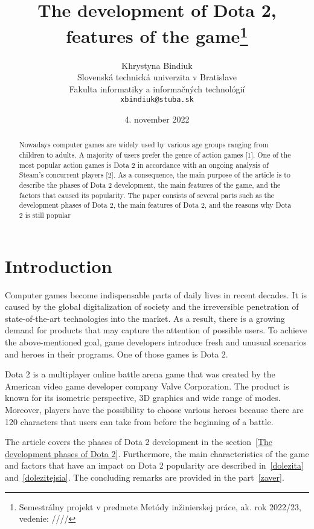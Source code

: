 \documentclass[10pt,twoside,slovak,a4paper]{article}
\title{The development of Dota 2, features of the game\thanks{Semestrálny projekt v predmete Metódy inžinierskej práce, ak. rok 2022/23, vedenie: //// }} %
\author{Khrystyna Bindiuk\\[2pt]
	{\small Slovenská technická univerzita v Bratislave}\\
	{\small Fakulta informatiky a informačných technológií}\\
	{\small \texttt{xbindiuk@stuba.sk}}
	}
\date{\small 4. november 2022} %
\begin{document}
\maketitle

\begin{abstract}

Nowadays computer games are widely used by various age groups ranging from children to adults. A majority of users prefer the genre of action games [1]. One of the most popular action games is Dota 2 in accordance with an ongoing analysis of Steam's concurrent players [2]. As a consequence, the main purpose of the article is to describe the phases of Dota 2 development, the main features of the game, and the factors that caused its popularity. The paper consists of several parts such as the development phases of Dota 2, the main features of Dota 2, and the reasons why Dota 2 is still popular
\end{abstract}



\section{Introduction}

Computer games become indispensable parts of daily lives in recent decades. It is caused by the global digitalization of society and the irreversible penetration of state-of-the-art technologies into the market. As a result, there is a growing demand for products that may capture the attention of possible users. To achieve the above-mentioned goal, game developers introduce fresh and unusual scenarios and heroes in their programs. One of those games is Dota 2. 

Dota 2 is a multiplayer online battle arena game that was created by the American video game developer company Valve Corporation. The product is known for its isometric perspective, 3D graphics and wide range of modes. Moreover, players have the possibility to choose various heroes because there are 120 characters that users can take from before the beginning of a battle.

The article covers the phases of Dota 2 development in the section~\ref{The development phases of Dota 2}. Furthermore, the main characteristics of the game and factors that have an impact on Dota 2 popularity are described in~\ref{dolezita} and~\ref{dolezitejsia}. The concluding remarks are provided in the part~\ref{zaver}.
\end{document}
